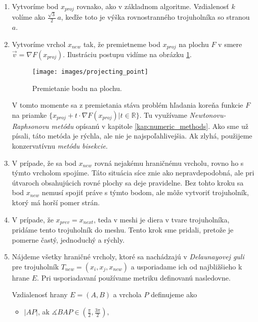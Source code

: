 \begin{enumerate}
    \item{
        Vytvoríme bod $x_{proj}$ rovnako, ako v základnom algoritme. Vzdialenosť $k$ volíme
        ako $\frac{\sqrt 3}{2} \, a$, keďže toto je výška rovnostranného trojuholníka so stranou $a$.
    }
    \item{
        Vytvoríme vrchol $x_{new}$ tak, že premietneme bod $x_{proj}$ na plochu $F$ v smere 
        $\vec{v} = \nabla F(x_{proj})$. Ilustráciu postupu vidíme na obrázku \ref{obr:projecting_point}.

        \begin{figure}
            \centerline{\texttt{[image: images/projecting\_point]}}
            \caption[Premietanie bodu na zadanú plochu]{Premietanie bodu na plochu.}
            \label{obr:projecting_point}
        \end{figure}

        V tomto momente sa z premietania 
        stáva problém hľadania koreňa funkcie $F$ na priamke 
        $\{x_{proj} + t \cdot \nabla F(x_{proj}) | t \in \mathbb{R}\}$.  
        Tu využívame
        \textit{Newtonovu-Raphsonovu metódu} opísanú v kapitole \ref{kap:numeric_methods}. Ako sme 
        už písali, táto metóda je rýchla, ale nie je najspoľahlivejšia. Ak zlyhá,
        použijeme konzervatívnu \textit{metódu bisekcie}.
    }
    \item{
        V prípade, že sa bod $x_{new}$ rovná nejakému hraničnému vrcholu, rovno ho s týmto vrcholom
        spojíme. Táto situácia síce znie ako nepravdepodobná, ale pri útvaroch obsahujúcich rovné plochy sa
        deje pravidelne. Bez tohto kroku sa bod $x_{new}$ nemusí spojiť práve s týmto bodom, ale
        môže vytvoriť trojuholník, ktorý má horší pomer strán.
    }
    \item{
        V prípade, že $x_{prev} = x_{next}$, teda v meshi je diera v tvare trojuholníka, pridáme tento 
        trojuholník do meshu. Tento krok sme pridali, pretože je pomerne častý, jednoduchý a rýchly.
    }
    \item{
        Nájdeme všetky hraničné vrcholy, ktoré sa nachádzajú v \textit{Delaunayovej guli} pre trojuholník 
        $T_{new} = (x_i, x_j, x_{new})$ a usporiadame ich od najbližšieho k hrane $E$. Pri usporiadavaní 
        používame metriku definovanú nasledovne.

        \begin{definition} Vzdialenosť hrany $E=(A,B)$ a vrchola $P$ definujeme ako
        \label{def:segment_point_distance}
        \begin{itemize}
            \item{
                $|AP|$, ak $\measuredangle BAP \in (\frac{\pi}{2}, \frac{3\pi}{2}),$
            }


\end{itemize}
\end{definition}}
\end{enumerate}
